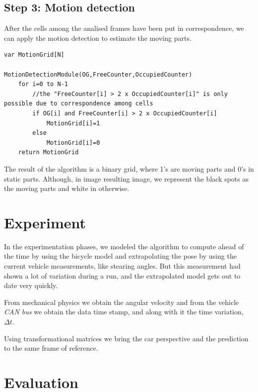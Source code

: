 \subsection{Step 3: Motion detection}

After the cells among the analised frames have been put in correspondence, we can apply the motion detection to estimate the moving parts.

\begin{lstlisting}[title={Transformation},label=al:transformation,caption={Previous grid transformation}]
var	MotionGrid[N]

MotionDetectionModule(OG,FreeCounter,OccupiedCounter)
	for i=0 to N-1
		//the "FreeCounter[i] > 2 x OccupiedCounter[i]" is only possible due to correspondence among cells
		if OG[i] and FreeCounter[i] > 2 x OccupiedCounter[i]
			MotionGrid[i]=1
		else
			MotionGrid[i]=0
	return MotionGrid
\end{lstlisting}

The result of the algorithm is a binary grid, where 1's are moving parts and 0's in static parts. Although, in image resulting image, we represent the black spots as the moving parts and white in otherwise.

\section{Experiment}

In the experimentation phases, we modeled the algorithm to compute ahead of the time by using the bicycle model and extrapolating the pose by using the current vehicle measurements, like stearing angles. But this measurement had shown a lot of variation during a run, and the extrapolated model gets out to date very quickly.

From mechanical physics we obtain the angular velocity and from the vehicle \emph{CAN bus} we obtain the data time stamp, and along with it the time variation, $\Delta t$.

Using transformational matrices we bring the car perspective \cite{iyengar1991autonomous} and the prediction to the same frame of reference.

\section{Evaluation}



